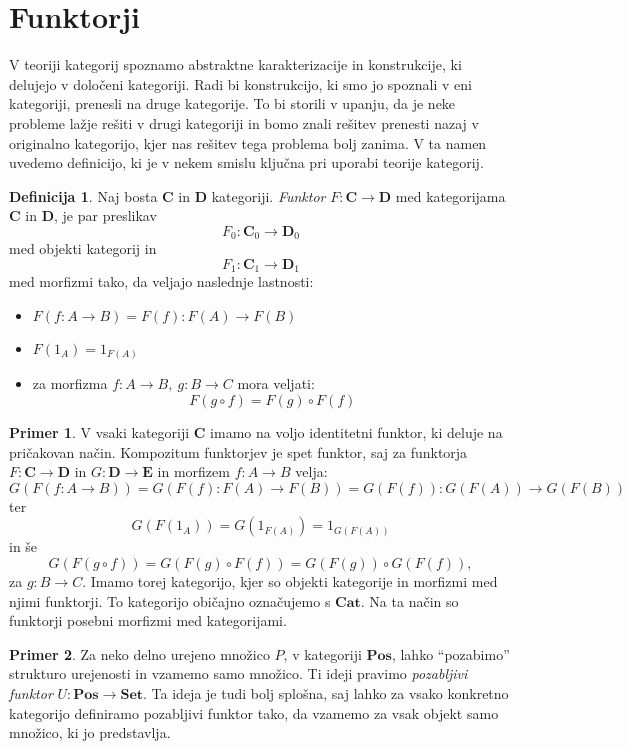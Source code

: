 \documentclass[12pt,a4paper]{book}
\theoremstyle{definition}
\newtheorem{definicija}{Definicija}[chapter]
\theoremstyle{plain}
\theoremstyle{definition}
\newtheorem{primer}{Primer}[section]
\theoremstyle{remark}
\newcommand{\cat}[1]{\textbf{#1}}
\begin{document}
\section{Funktorji}

V teoriji kategorij spoznamo abstraktne karakterizacije in konstrukcije, ki delujejo v določeni kategoriji. Radi bi konstrukcijo, ki smo jo spoznali v eni kategoriji, prenesli na druge kategorije. To bi storili v upanju, da je neke probleme lažje rešiti v drugi kategoriji in bomo znali rešitev prenesti nazaj v originalno kategorijo, kjer nas rešitev tega problema bolj zanima. V ta namen uvedemo definicijo, ki je v nekem smislu ključna pri uporabi teorije kategorij.

\begin{definicija}
Naj bosta $\cat{C}$ in $\cat{D}$ kategoriji. \emph{Funktor} $F : \cat{C} \to \cat{D}$ med kategorijama $\cat{C}$ in $\cat{D}$, je par preslikav
$$F_0 : \cat{C}_0 \to \cat{D}_0$$
med objekti kategorij in
$$F_1 : \cat{C}_1 \to \cat{D}_1$$
med morfizmi tako, da veljajo naslednje lastnosti:
\begin{itemize}
\item $F(f : A \to B) = F(f) : F(A) \to F(B)$
\item $F(1_A) = 1_{F(A)}$
\item za morfizma $f : A \to B, \ g : B \to C$ mora veljati:
$$F(g \circ f) = F(g) \circ F(f)$$
\end{itemize}
\end{definicija}

\begin{primer}
V vsaki kategoriji $\cat{C}$ imamo na voljo identitetni funktor, ki deluje na pričakovan način. Kompozitum funktorjev je spet funktor, saj za funktorja $F : \cat{C} \to \cat{D}$ in $G : \cat{D} \to \cat{E}$ in morfizem $f : A \to B$ velja:
$$G(F(f : A \to B)) = G(F(f) : F(A) \to F(B)) = G(F(f)) : G(F(A)) \to G(F(B))$$
ter
$$G(F(1_A)) = G(1_{F(A)}) = 1_{G(F(A))}$$
in še
$$G(F(g \circ f)) = G(F(g) \circ F(f)) = G(F(g)) \circ G(F(f)),$$
za $g : B \to C$. Imamo torej kategorijo, kjer so objekti kategorije in morfizmi med njimi funktorji. To kategorijo običajno označujemo s $\cat{Cat}$. Na ta način so funktorji posebni morfizmi med kategorijami.
\end{primer}

\begin{primer}
Za neko delno urejeno množico $P$, v kategoriji $\cat{Pos}$, lahko "`pozabimo"' strukturo urejenosti in vzamemo samo množico. Ti ideji pravimo \emph{pozabljivi funktor} $U : \cat{Pos} \to \cat{Set}$. Ta ideja je tudi bolj splošna, saj lahko za vsako konkretno kategorijo definiramo pozabljivi funktor tako, da vzamemo za vsak objekt samo množico, ki jo predstavlja.
\end{primer}
\end{document}

